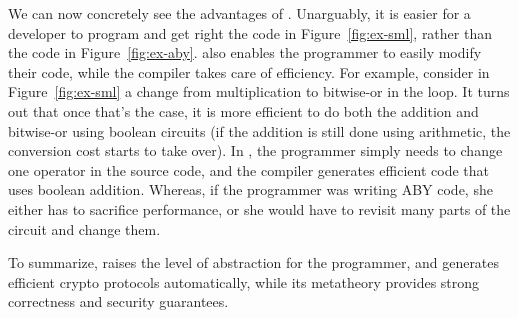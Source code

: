 We can now concretely see the advantages of \tool. Unarguably, it is
easier for a developer to program and get right the code in
Figure~\ref{fig:ex-sml}, rather than the code in
Figure~\ref{fig:ex-aby}.
\tool also enables the
programmer to easily modify their code, while the compiler takes care
of efficiency. For example, consider in Figure~\ref{fig:ex-sml} a
change from multiplication to bitwise-or in the  loop. It
turns out that once that's the case, it is more efficient to do both
the addition and bitwise-or using boolean circuits (if the addition is
still done using arithmetic, the conversion cost starts to take
over). In \tool, the programmer simply needs to change one operator in
the source code, and the compiler generates efficient code that uses
boolean addition. Whereas, if the programmer was writing ABY
code, she either has to sacrifice performance, or she would have to
revisit many parts of the circuit and change them.

To summarize, \tool raises the level of abstraction for the
programmer, and generates efficient crypto protocols automatically,
while its metatheory provides strong correctness and security
guarantees. 

